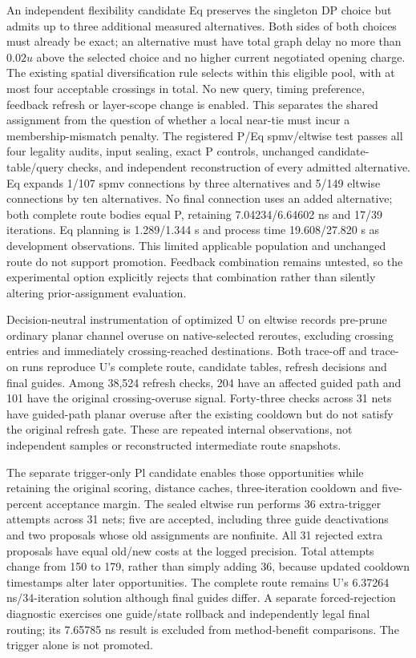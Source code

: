 \documentclass[conference,10pt]{IEEEtran}
\begin{document}
An independent flexibility candidate Eq preserves the singleton DP choice but admits up to three additional measured alternatives. Both sides of both choices must already be exact; an alternative must have total graph delay no more than $0.02u$ above the selected choice and no higher current negotiated opening charge. The existing spatial diversification rule selects within this eligible pool, with at most four acceptable crossings in total. No new query, timing preference, feedback refresh or layer-scope change is enabled. This separates the shared assignment from the question of whether a local near-tie must incur a membership-mismatch penalty. The registered P/Eq spmv/eltwise test passes all four legality audits, input sealing, exact P controls, unchanged candidate-table/query checks, and independent reconstruction of every admitted alternative. Eq expands 1/107 spmv connections by three alternatives and 5/149 eltwise connections by ten alternatives. No final connection uses an added alternative; both complete route bodies equal P, retaining 7.04234/6.64602 ns and 17/39 iterations. Eq planning is 1.289/1.344 s and process time 19.608/27.820 s as development observations. This limited applicable population and unchanged route do not support promotion. Feedback combination remains untested, so the experimental option explicitly rejects that combination rather than silently altering prior-assignment evaluation.

Decision-neutral instrumentation of optimized U on eltwise records pre-prune ordinary planar channel overuse on native-selected reroutes, excluding crossing entries and immediately crossing-reached destinations. Both trace-off and trace-on runs reproduce U's complete route, candidate tables, refresh decisions and final guides. Among 38,524 refresh checks, 204 have an affected guided path and 101 have the original crossing-overuse signal. Forty-three checks across 31 nets have guided-path planar overuse after the existing cooldown but do not satisfy the original refresh gate. These are repeated internal observations, not independent samples or reconstructed intermediate route snapshots.

The separate trigger-only Pl candidate enables those opportunities while retaining the original scoring, distance caches, three-iteration cooldown and five-percent acceptance margin. The sealed eltwise run performs 36 extra-trigger attempts across 31 nets; five are accepted, including three guide deactivations and two proposals whose old assignments are nonfinite. All 31 rejected extra proposals have equal old/new costs at the logged precision. Total attempts change from 150 to 179, rather than simply adding 36, because updated cooldown timestamps alter later opportunities. The complete route remains U's 6.37264 ns/34-iteration solution although final guides differ. A separate forced-rejection diagnostic exercises one guide/state rollback and independently legal final routing; its 7.65785 ns result is excluded from method-benefit comparisons. The trigger alone is not promoted.
\end{document}

